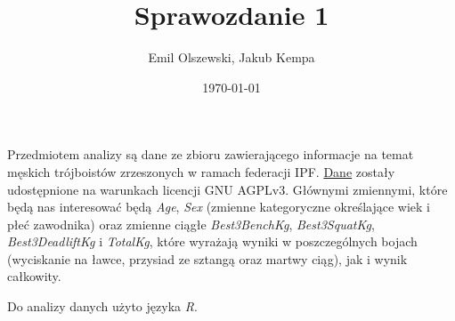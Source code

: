 \documentclass{article}\usepackage[]{graphicx}\usepackage[]{xcolor}
\author{Emil Olszewski, Jakub Kempa}
\date{\today}
\title{Sprawozdanie 1}
\begin{document}
\maketitle


Przedmiotem analizy są dane ze zbioru zawierającego informacje na temat 
męskich trójboistów zrzeszonych w ramach federacji IPF. \href{https://gitlab.com/openpowerlifting/opl-data}{Dane} zostały udostępnione na warunkach licencji GNU AGPLv3. 
Głównymi zmiennymi, które będą nas interesować będą \textit{Age}, \textit{Sex} (zmienne kategoryczne określające wiek i płeć zawodnika) oraz zmienne ciągłe \textit{Best3BenchKg}, \textit{Best3SquatKg}, \textit{Best3DeadliftKg} i \textit{TotalKg}, które wyrażają wyniki w poszczególnych bojach (wyciskanie na ławce, przysiad ze sztangą oraz martwy ciąg), jak i wynik całkowity.


Do analizy danych użyto języka \textit{R}.
\end{document}

